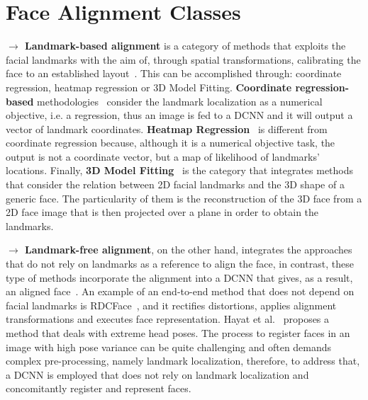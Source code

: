 \documentclass[class=report, crop=false, a4paper, 12pt]{standalone}
\begin{document}
\section*{Face Alignment Classes}\label{sec:face_alignment_appendix}
\noindent\textbf{$\rightarrow$ Landmark-based alignment} is a category of methods that exploits the facial landmarks with the aim of, through spatial transformations, calibrating the face to an established layout~\autocite{duElementsEndtoendDeep2022}. This can be accomplished through: coordinate regression, heatmap regression or 3D Model Fitting. \textbf{Coordinate regression-based} methodologies~\autocite{fengWingLossRobust2018,liuTwoStreamTransformerNetworks2018,zhangJointFaceDetection2016a} consider the landmark localization as a numerical objective, i.e. a regression, thus an image is fed to a DCNN and it will output a vector of landmark coordinates. \textbf{Heatmap Regression}~\autocite{dengJointMultiviewFace2017,wuLookBoundaryBoundaryAware2018,chenFaceAlignmentKernel2019} is different from coordinate regression because, although it is a numerical objective task, the output is not a coordinate vector, but a map of likelihood of landmarks' locations. Finally, \textbf{3D Model Fitting}~\autocite{bhagavatulaFasterRealtimeFacial2017,changFacePoseNetMakingCase2017,xiaoRecurrent3D2DDual2017} is the category that integrates methods that consider the relation between 2D facial landmarks and the 3D shape of a generic face. The particularity of them is the reconstruction of the 3D face from a 2D face image that is then projected over a plane in order to obtain the landmarks. 

\vspace{0.7\baselineskip}
\noindent\textbf{$\rightarrow$ Landmark-free alignment}, on the other hand, integrates the approaches that do not rely on landmarks as a reference to align the face, in contrast, these type of methods incorporate the alignment into a DCNN that gives, as a result, an aligned face~\autocite{duElementsEndtoendDeep2022}. An example of an end-to-end method that does not depend on facial landmarks is RDCFace~\autocite{zhaoRDCFaceRadialDistortion2020}, and it rectifies distortions, applies alignment transformations and executes face representation. Hayat et al.~\autocite{hayatJointRegistrationRepresentation2017} proposes a method that deals with extreme head poses. The process to register faces in an image with high pose variance can be quite challenging and often demands complex pre-processing, namely landmark localization, therefore, to address that, a DCNN is employed that does not rely on landmark localization and concomitantly register and represent faces.
\end{document}
